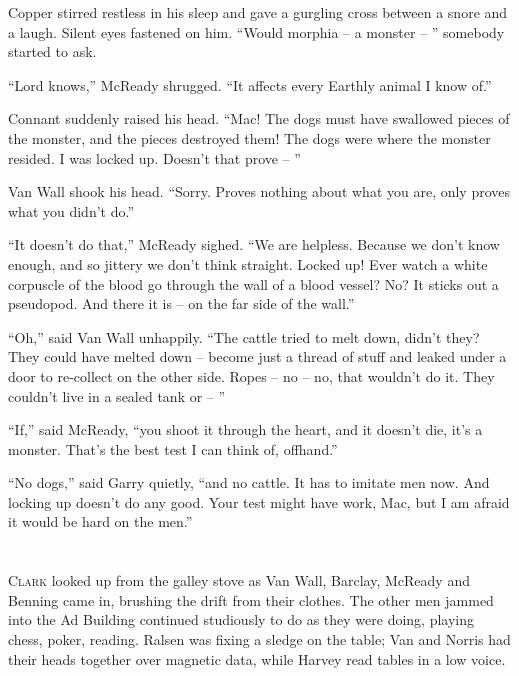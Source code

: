 \documentclass[letterpaper,openany,12pt]{memoir}		%
\begin{document}
Copper stirred restless in his sleep and gave a gurgling cross between a snore
and a laugh. Silent eyes fastened on him. ``Would morphia -- a monster -- ''
somebody started to ask.

``Lord knows,'' McReady shrugged. ``It affects every Earthly animal I know of.''

Connant suddenly raised his head. ``Mac! The dogs must have swallowed pieces of
the monster, and the pieces destroyed them! The dogs were where the monster
resided. I was locked up. Doesn't that prove -- ''

Van Wall shook his head. ``Sorry. Proves nothing about what you are, only proves
what you didn't do.''

``It doesn't do that,'' McReady sighed. ``We are helpless. Because we don't know
enough, and so jittery we don't think straight. Locked up! Ever watch a white
corpuscle of the blood go through the wall of a blood vessel? No? It sticks out
a pseudopod. And there it is -- on the far side of the wall.''

``Oh,'' said Van Wall unhappily. ``The cattle tried to melt down, didn't they?
They could have melted down -- become just a thread of stuff and leaked under a
door to re-collect on the other side. Ropes -- no -- no, that wouldn't do it.
They couldn't live in a sealed tank or -- ''

``If,'' said McReady, ``you shoot it through the heart, and it doesn't die, it's
a monster. That's the best test I can think of, offhand.''

``No dogs,'' said Garry quietly, ``and no cattle. It has to imitate men now. And
locking up doesn't do any good. Your test might have work, Mac, but I am afraid
it would be hard on the men.''


\chapter[Chapter 10]{}

\lettrine[lines=3,findent=3pt,nindent=2pt]{C}{lark} looked up from the galley
stove as Van Wall, Barclay, McReady and Benning came in, brushing the drift from
their clothes. The other men jammed into the Ad Building continued studiously to
do as they were doing, playing chess, poker, reading. Ralsen was fixing a sledge
on the table; Van and Norris had their heads together over magnetic data, while
Harvey read tables in a low voice.
\end{document}
